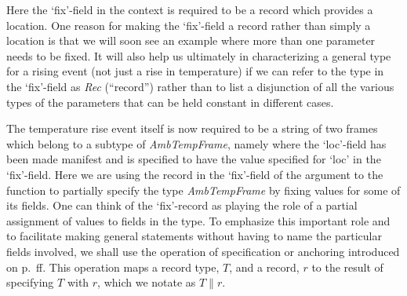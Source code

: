 Here the `fix'-field in the context is required to be a record which
provides a location.  One reason for making the `fix'-field a record
rather than simply a location is that we will soon see an example
where more than one parameter needs to be fixed.  It will also help us
ultimately in characterizing a general type for a rising event (not
just a rise in temperature) if we can refer to the type in the
`fix'-field as \textit{Rec} (``record'') rather than to list a
disjunction of all the various types of the parameters that can be
held constant in different cases.

The temperature rise event itself is now required to be a string of
two frames which belong to a subtype of \textit{AmbTempFrame}, namely
where the `loc'-field has been made manifest and is specified to have
the value specified for `loc' in the `fix'-field.  Here we are using
the record in the `fix'-field of the argument to the function to
partially specify the type \textit{AmbTempFrame} by fixing values for
some of its fields.  One can think of the `fix'-record as playing the
role of a partial
assignment of values to fields in the type.  To emphasize this
important role and to facilitate making general statements without
having to name the particular fields involved, we shall use the
operation of specification or anchoring introduced on p.~\pageref{pg:anchoring}ff. This operation maps a record
type, $T$, and a record, $r$ to the result of specifying $T$ with $r$,
which we notate as $T\parallel r$.
%
